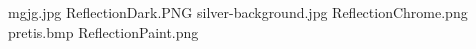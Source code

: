mgjg.jpg
ReflectionDark.PNG
silver-background.jpg
ReflectionChrome.png
pretis.bmp
ReflectionPaint.png
